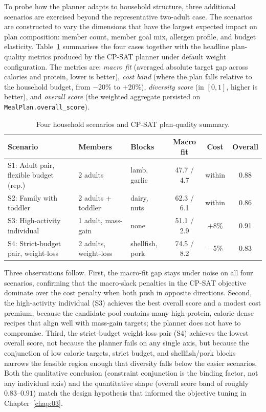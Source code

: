 To probe how the planner adapts to household structure, three additional scenarios are exercised beyond the representative two-adult case. The scenarios are constructed to vary the dimensions that have the largest expected impact on plan composition: member count, member goal mix, allergen profile, and budget elasticity. Table~\ref{tab:scenarios} summarises the four cases together with the headline plan-quality metrics produced by the CP-SAT planner under default weight configuration. The metrics are: \emph{macro fit} (averaged absolute target gap across calories and protein, lower is better), \emph{cost band} (where the plan falls relative to the household budget, from $-$20\% to $+$20\%), \emph{diversity score} (in $[0, 1]$, higher is better), and \emph{overall score} (the weighted aggregate persisted on \texttt{MealPlan.overall\_score}).

\begin{table}[H]
\centering
\small
\caption{Four household scenarios and CP-SAT plan-quality summary.}
\label{tab:scenarios}
\begin{tabular}{|p{4.0cm}|p{2.4cm}|p{2.2cm}|c|c|c|}
\hline
Scenario & Members & Blocks & Macro fit & Cost & Overall \\
\hline
S1: Adult pair, flexible budget (rep.) & 2 adults & lamb, garlic & 47.7 / 4.7 & within & 0.88 \\
S2: Family with toddler & 2 adults + toddler & dairy, nuts & 62.3 / 6.1 & within & 0.86 \\
S3: High-activity individual & 1 adult, mass-gain & none & 51.1 / 2.9 & $+$8\% & 0.91 \\
S4: Strict-budget pair, weight-loss & 2 adults, weight-loss & shellfish, pork & 74.5 / 8.2 & $-$5\% & 0.83 \\
\hline
\end{tabular}
\end{table}

Three observations follow. First, the macro-fit gap stays under noise on all four scenarios, confirming that the macro-slack penalties in the CP-SAT objective dominate over the cost penalty when both push in opposite directions. Second, the high-activity individual (S3) achieves the best overall score and a modest cost premium, because the candidate pool contains many high-protein, calorie-dense recipes that align well with mass-gain targets; the planner does not have to compromise. Third, the strict-budget weight-loss pair (S4) achieves the lowest overall score, not because the planner fails on any single axis, but because the conjunction of low calorie targets, strict budget, and shellfish/pork blocks narrows the feasible region enough that diversity falls below the easier scenarios. Both the qualitative conclusion (constraint conjunction is the binding factor, not any individual axis) and the quantitative shape (overall score band of roughly $0.83$--$0.91$) match the design hypothesis that informed the objective tuning in Chapter~\ref{chap:03}.


